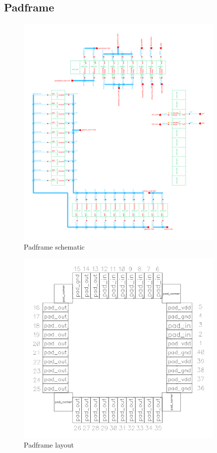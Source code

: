 \documentclass[]{article}
\begin{document}
\subsection{Padframe}
\begin{figure}[H]
\centering
\includegraphics[width=0.9\textwidth]{padframe-schematic}
\caption{Padframe schematic}
\label{fig:padframe-schematic}
\end{figure}

\begin{figure}[H]
\centering
\includegraphics[width=0.9\textwidth]{padframe-layout0}
\caption{Padframe layout}
\label{fig:padframe-layout}
\end{figure}
\end{document}
